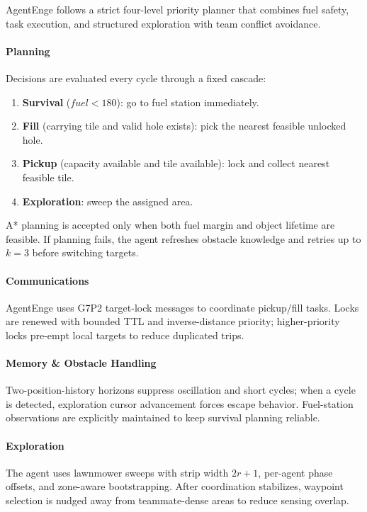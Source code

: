 \documentclass{article}
\begin{document}
AgentEnge follows a strict four-level priority planner that combines fuel safety, task execution, and structured exploration with team conflict avoidance.

\paragraph{Planning}
Decisions are evaluated every cycle through a fixed cascade:
\begin{enumerate}
  \item \textbf{Survival} (\(fuel<180\)): go to fuel station immediately.
  \item \textbf{Fill} (carrying tile and valid hole exists): pick the nearest feasible unlocked hole.
  \item \textbf{Pickup} (capacity available and tile available): lock and collect nearest feasible tile.
  \item \textbf{Exploration}: sweep the assigned area.
\end{enumerate}
A* planning is accepted only when both fuel margin and object lifetime are feasible.
If planning fails, the agent refreshes obstacle knowledge and retries up to \(k=3\) before switching targets.

\paragraph{Communications}
AgentEnge uses G7P2 target-lock messages to coordinate pickup/fill tasks.
Locks are renewed with bounded TTL and inverse-distance priority; higher-priority locks pre-empt local targets to reduce duplicated trips.

\paragraph{Memory \& Obstacle Handling}
Two-position-history horizons suppress oscillation and short cycles; when a cycle is detected, exploration cursor advancement forces escape behavior.
Fuel-station observations are explicitly maintained to keep survival planning reliable.

\paragraph{Exploration}
The agent uses lawnmower sweeps with strip width \(2r+1\), per-agent phase offsets, and zone-aware bootstrapping.
After coordination stabilizes, waypoint selection is nudged away from teammate-dense areas to reduce sensing overlap.
\end{document}
